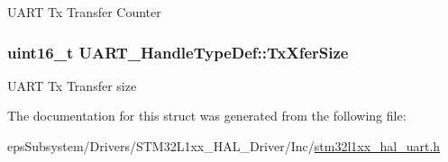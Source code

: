 U\-A\-R\-T Tx Transfer Counter \hypertarget{struct_u_a_r_t___handle_type_def_a98e2ea90caba72ac0cd5b1815a5ccb81}{
\subsubsection[{Tx\-Xfer\-Size}]{\setlength{\rightskip}{0pt plus 5cm}uint16\-\_\-t U\-A\-R\-T\-\_\-\-Handle\-Type\-Def\-::\-Tx\-Xfer\-Size}}\label{struct_u_a_r_t___handle_type_def_a98e2ea90caba72ac0cd5b1815a5ccb81}
U\-A\-R\-T Tx Transfer size 

The documentation for this struct was generated from the following file\-:\begin{DoxyCompactItemize}
\item 
eps\-Subsystem/\-Drivers/\-S\-T\-M32\-L1xx\-\_\-\-H\-A\-L\-\_\-\-Driver/\-Inc/\hyperlink{stm32l1xx__hal__uart_8h}{stm32l1xx\-\_\-hal\-\_\-uart.\-h}\end{DoxyCompactItemize}
